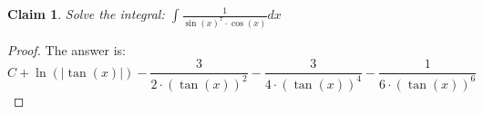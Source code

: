 \documentclass{article}
\newtheorem{theorem}{Claim}
\begin{document}
\begin{theorem}
Solve the integral:
$
\int \frac{ 1 }{ \sin(x)^7 \cdot \cos(x) }   dx
$
\end{theorem}

\begin{proof}
The answer is:
\[
C+\ln\left(\left|\tan(x)\right|\right)-\frac{3}{2\cdot\left(\tan(x)\right)^2}-\frac{3}{4\cdot\left(\tan(x)\right)^4}-\frac{1}{6\cdot\left(\tan(x)\right)^6}
\]
\end{proof}
\end{document}
